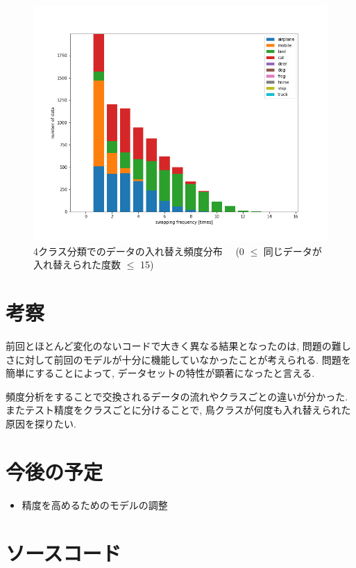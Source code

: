 \documentclass[twocolumn]{jarticle}     %
\begin{document}
\begin{figure}[tb]
	\begin{center}
		\includegraphics[clip,width=13cm]{swaptimes4.png}
		\caption{4クラス分類でのデータの入れ替え頻度分布　
    (0 $\leq$ 同じデータが入れ替えられた度数 $\leq$ 15)
    }
		\label{fig:swaptimes}
	\end{center}
\end{figure}

\section{考察}
前回とほとんど変化のないコードで大きく異なる結果となったのは, 問題の難しさに対して前回のモデルが十分に機能していなかったことが考えられる. 問題を簡単にすることによって, データセットの特性が顕著になったと言える.

頻度分析をすることで交換されるデータの流れやクラスごとの違いが分かった. またテスト精度をクラスごとに分けることで, 鳥クラスが何度も入れ替えられた原因を探りたい.

\section{今後の予定}
\begin{itemize}
	\item {精度を高めるためのモデルの調整}
\end{itemize}

\section{ソースコード}





\end{document}
